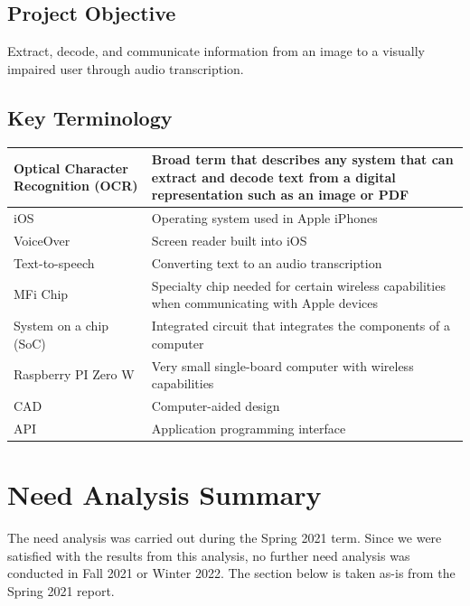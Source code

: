 \documentclass[a4paper,11pt]{article}
\begin{document}
\subsection{Project Objective}
Extract, decode, and communicate information from an image to a visually impaired user through audio transcription.

\subsection{Key Terminology}
\setlength{\tabcolsep}{1em}
\begin{table}[ht]
    \centering
    \begin{tabular}{|p{5cm}|p{10cm}|}
        \hline
        Optical Character Recognition (OCR) & Broad term that describes any system that can extract and decode text from a digital representation such as an image or PDF \\ \hline
        iOS & Operating system used in Apple iPhones \\ \hline
        VoiceOver & Screen reader built into iOS \\ \hline
        Text-to-speech & Converting text to an audio transcription \\ \hline
        MFi Chip & Specialty chip needed for certain wireless capabilities when communicating with Apple devices \\ \hline
        System on a chip (SoC) & Integrated circuit that integrates the components of a computer \\ \hline
        Raspberry PI Zero W & Very small single-board computer with wireless capabilities \\ \hline
        CAD & Computer-aided design \\
        \hline
        API & Application programming interface \\
        \hline
    \end{tabular}
\end{table}

\section{Need Analysis Summary}
\label{need-analysis-summary}
The need analysis was carried out during the Spring 2021 term. Since we were satisfied with the results from this analysis, no further need analysis was conducted in Fall 2021 or Winter 2022. The section below is taken as-is from the Spring 2021 report.
\end{document}
